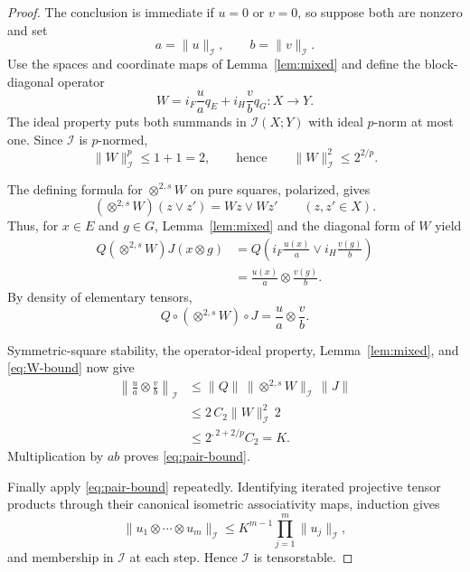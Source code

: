 \documentclass[11pt]{article}
\newcommand{\I}{\mathcal I}
\begin{document}
\begin{proof}
The conclusion is immediate if $u=0$ or $v=0$, so suppose both are nonzero
and set
\[
                         a=\|u\|_{\I},\qquad b=\|v\|_{\I}.
\]
Use the spaces and coordinate maps of Lemma~\ref{lem:mixed} and define the
block-diagonal operator
\[
 W=i_F\frac{u}{a}q_E+i_H\frac{v}{b}q_G:X\longrightarrow Y.
\]
The ideal property puts both summands in $\I(X;Y)$ with ideal $p$-norm at
most one. Since $\I$ is $p$-normed,
\begin{equation}\label{eq:W-bound}
                    \|W\|_{\I}^{p}\le1+1=2,
 \qquad\text{hence}\qquad \|W\|_{\I}^{2}\le2^{2/p}.
\end{equation}

The defining formula for $\otimes^{2,s}W$ on pure squares, polarized, gives
\begin{equation}\label{eq:polarized-action}
 (\otimes^{2,s}W)(z\vee z')=Wz\vee Wz'
 \qquad(z,z'\in X).
\end{equation}
Thus, for $x\in E$ and $g\in G$, Lemma~\ref{lem:mixed} and the diagonal
form of $W$ yield
\begin{align*}
 Q(\otimes^{2,s}W)J(x\otimes g)
 &=Q\left(i_F\frac{u(x)}a\vee i_H\frac{v(g)}b\right)\\
 &=\frac{u(x)}a\otimes\frac{v(g)}b.
\end{align*}
By density of elementary tensors,
\begin{equation}\label{eq:factorization}
 Q\circ(\otimes^{2,s}W)\circ J
 =\frac{u}{a}\otimes\frac{v}{b}.
\end{equation}

Symmetric-square stability, the operator-ideal property,
Lemma~\ref{lem:mixed}, and \eqref{eq:W-bound} now give
\begin{align*}
 \left\|\frac{u}{a}\otimes\frac{v}{b}\right\|_{\I}
 &\le\|Q\|\,\|\otimes^{2,s}W\|_{\I}\,\|J\|\\
 &\le 2\,C_2\|W\|_{\I}^{2}\,2\\
 &\le 2^{,2+2/p}C_2=K.
\end{align*}
Multiplication by $ab$ proves \eqref{eq:pair-bound}.

Finally apply \eqref{eq:pair-bound} repeatedly. Identifying iterated
projective tensor products through their canonical isometric associativity
maps, induction gives
\[
 \|u_1\otimes\cdots\otimes u_m\|_{\I}
 \le K^{m-1}\prod_{j=1}^m\|u_j\|_{\I},
\]
and membership in $\I$ at each step. Hence $\I$ is tensorstable.
\end{proof}
\end{document}
